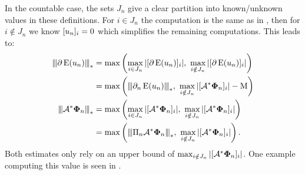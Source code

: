 \documentclass[10pt,a4paper,onecolumn]{article}
\numberwithin{equation}{section}
\newcommand{\Norm}[1]{{\left\vert\kern-0.25ex\left\vert\kern-0.25ex\left\vert #1 \right\vert\kern-0.25ex\right\vert\kern-0.25ex\right\vert}}
\newcommand{\op}[1]{\operatorname{#1}}\newcommand{\overtext}[2]{\stackrel{\text{#1}}{#2}}
\renewcommand{\vec}{\mathbf}
\newcommand*{\Func}[1]{%
	\IfEqCase{#1}{%
		{0}{\op{E}}%
		{1}{\op{F}}%
		{2}{\op{G}}%
		{3}{\op{H}}%
	}[\op{F}#1]%
}
\newcommand*{\varf}[1]{%
	\IfEqCase{#1}{%
		{0}{u}%
		{1}{v}%
		{2}{w}%
	}[u#1]%
}
\newcommand*{\vard}[1]{%
	\IfEqCase{#1}{%
		{0}{\varphi}%
		{1}{\psi}%
	}[\varphi #1]%
}
\newcommand*{\data}[1]{%
	\IfEqCase{#1}{%
		{0}{\eta}%
		{1}{\nu}%
	}[g]%
}
\newcommand*{\vvard}[1]{\vec{\vard{#1}}}\newcommand*{\vdata}[1]{\vec{\data{#1}}}
\begin{document}
In the countable case, the sets $J_n$ give a clear partition into known/unknown values in these definitions. For $i\in J_n$ the computation is the same as in , then for $i\notin J_n$ we know $[\varf0_n]_i=0$ which simplifies the remaining computations. This leads to:
\begin{align}
	\Norm{\partial\Func0(\varf0_n)}_* &= \max\left(\max_{i\in J_n}|[\partial\Func0(\varf0_n)]_i|,\ \max_{i\notin J_n} |[\partial\Func0(\varf0_n)]_i|\right)
	\\&= \max\left(\Norm{\partial_n\Func0(\varf0_n)}_*,\ \max_{i\notin J_n} |[\A^*\vvard0_n]_i|-\mu\right)
	\\ \Norm{\A^*\vvard0_n}_* &= \max\left(\max_{i\in J_n}|[\A^*\vvard0_n]_i|,\ \max_{i\notin J_n} |[\A^*\vvard0_n]_i|\right)
	\\ &= \max\left(\Norm{\Pi_n\A^*\vvard0_n}_*,\ \max_{i\notin J_n} |[\A^*\vvard0_n]_i|\right).
\end{align}
Both estimates only rely on an upper bound of $\max_{i\notin J_n} |[\A^*\vvard0_n]_i|$. One example computing this value is seen in .
\end{document}
